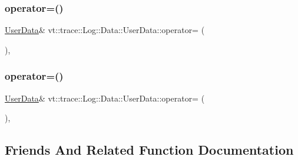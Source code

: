 \subsubsection{\texorpdfstring{operator=()}{operator=()}\hspace{0.1cm}{\footnotesize\ttfamily [1/2]}}
{\footnotesize\ttfamily \hyperlink{structvt_1_1trace_1_1_log_1_1_data_1_1_user_data}{User\+Data}\& vt\+::trace\+::\+Log\+::\+Data\+::\+User\+Data\+::operator= (\begin{DoxyParamCaption}\item[{\hyperlink{structvt_1_1trace_1_1_log_1_1_data_1_1_user_data}{User\+Data} const \&}]{ }\end{DoxyParamCaption})\hspace{0.3cm}{\ttfamily [private]}, {\ttfamily [default]}}

\mbox{\label{structvt_1_1trace_1_1_log_1_1_data_1_1_user_data_af28757a8247d33ab89946fb728a5cc7f}} 
\subsubsection{\texorpdfstring{operator=()}{operator=()}\hspace{0.1cm}{\footnotesize\ttfamily [2/2]}}
{\footnotesize\ttfamily \hyperlink{structvt_1_1trace_1_1_log_1_1_data_1_1_user_data}{User\+Data}\& vt\+::trace\+::\+Log\+::\+Data\+::\+User\+Data\+::operator= (\begin{DoxyParamCaption}\item[{\hyperlink{structvt_1_1trace_1_1_log_1_1_data_1_1_user_data}{User\+Data} \&\&}]{ }\end{DoxyParamCaption})\hspace{0.3cm}{\ttfamily [private]}, {\ttfamily [default]}}



\subsection{Friends And Related Function Documentation}
\mbox{\label{structvt_1_1trace_1_1_log_1_1_data_1_1_user_data_add132ae9df1b7ef820c8082c32b0f839}} 
